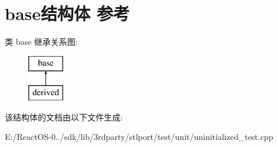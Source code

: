 \hypertarget{structbase}{}\section{base结构体 参考}
\label{structbase}
类 base 继承关系图\+:\begin{figure}[H]
\begin{center}
\leavevmode
\includegraphics[height=2.000000cm]{structbase}
\end{center}
\end{figure}


该结构体的文档由以下文件生成\+:\begin{DoxyCompactItemize}
\item 
E\+:/\+React\+O\+S-\/0../sdk/lib/3rdparty/stlport/test/unit/uninitialized\+\_\+test.\+cpp\end{DoxyCompactItemize}
